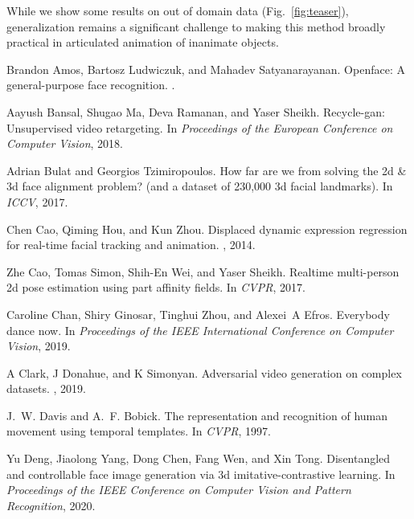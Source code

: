 \documentclass[final]{cvpr}
\begin{document}
While we show some results on out of domain data (Fig.~\ref{fig:teaser}), generalization remains a significant challenge to making this method broadly practical in articulated animation of inanimate objects.
\clearpage
\begin{thebibliography}{10}\itemsep=-1pt

Brandon Amos, Bartosz Ludwiczuk, and Mahadev Satyanarayanan.
\newblock Openface: A general-purpose face recognition.
.

Aayush Bansal, Shugao Ma, Deva Ramanan, and Yaser Sheikh.
\newblock Recycle-gan: Unsupervised video retargeting.
\newblock In {\em Proceedings of the European Conference on Computer Vision},
  2018.

Adrian Bulat and Georgios Tzimiropoulos.
\newblock How far are we from solving the 2d \& 3d face alignment problem? (and
  a dataset of 230,000 3d facial landmarks).
\newblock In {\em ICCV}, 2017.

Chen Cao, Qiming Hou, and Kun Zhou.
\newblock Displaced dynamic expression regression for real-time facial tracking
  and animation.
, 2014.

Zhe Cao, Tomas Simon, Shih-En Wei, and Yaser Sheikh.
\newblock Realtime multi-person 2d pose estimation using part affinity fields.
\newblock In {\em CVPR}, 2017.

Caroline Chan, Shiry Ginosar, Tinghui Zhou, and Alexei~A Efros.
\newblock Everybody dance now.
\newblock In {\em Proceedings of the IEEE International Conference on Computer
  Vision}, 2019.

A Clark, J Donahue, and K Simonyan.
\newblock Adversarial video generation on complex datasets.
, 2019.

J.~W. {Davis} and A.~F. {Bobick}.
\newblock The representation and recognition of human movement using temporal
  templates.
\newblock In {\em CVPR}, 1997.

Yu Deng, Jiaolong Yang, Dong Chen, Fang Wen, and Xin Tong.
\newblock Disentangled and controllable face image generation via 3d
  imitative-contrastive learning.
\newblock In {\em Proceedings of the IEEE Conference on Computer Vision and
  Pattern Recognition}, 2020.


\end{thebibliography}
\end{document}
